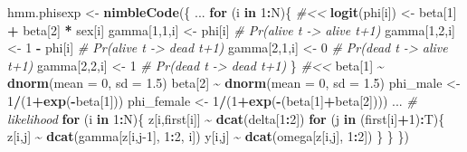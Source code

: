 \documentclass[
  12pt,
]{krantz}
\newenvironment{Shaded}{\begin{snugshade}}{\end{snugshade}}
\newcommand{\AttributeTok}[1]{\textcolor[rgb]{0.13,0.29,0.53}{#1}}
\newcommand{\CommentTok}[1]{\textcolor[rgb]{0.56,0.35,0.01}{\textit{#1}}}
\newcommand{\ControlFlowTok}[1]{\textcolor[rgb]{0.13,0.29,0.53}{\textbf{#1}}}
\newcommand{\DecValTok}[1]{\textcolor[rgb]{0.00,0.00,0.81}{#1}}
\newcommand{\FloatTok}[1]{\textcolor[rgb]{0.00,0.00,0.81}{#1}}
\newcommand{\FunctionTok}[1]{\textcolor[rgb]{0.13,0.29,0.53}{\textbf{#1}}}
\newcommand{\NormalTok}[1]{#1}
\newcommand{\OtherTok}[1]{\textcolor[rgb]{0.56,0.35,0.01}{#1}}
\newcommand{\SpecialCharTok}[1]{\textcolor[rgb]{0.81,0.36,0.00}{\textbf{#1}}}
\begin{document}
\begin{Shaded}
\begin{Highlighting}[]
\NormalTok{hmm.phisexp }\OtherTok{\textless{}{-}} \FunctionTok{nimbleCode}\NormalTok{(\{}
\NormalTok{...}
  \ControlFlowTok{for}\NormalTok{ (i }\ControlFlowTok{in} \DecValTok{1}\SpecialCharTok{:}\NormalTok{N)\{ }\CommentTok{\#\textless{}\textless{}}
    \FunctionTok{logit}\NormalTok{(phi[i]) }\OtherTok{\textless{}{-}}\NormalTok{ beta[}\DecValTok{1}\NormalTok{] }\SpecialCharTok{+}\NormalTok{ beta[}\DecValTok{2}\NormalTok{] }\SpecialCharTok{*}\NormalTok{ sex[i]}
\NormalTok{    gamma[}\DecValTok{1}\NormalTok{,}\DecValTok{1}\NormalTok{,i] }\OtherTok{\textless{}{-}}\NormalTok{ phi[i]      }\CommentTok{\# Pr(alive t {-}\textgreater{} alive t+1)}
\NormalTok{    gamma[}\DecValTok{1}\NormalTok{,}\DecValTok{2}\NormalTok{,i] }\OtherTok{\textless{}{-}} \DecValTok{1} \SpecialCharTok{{-}}\NormalTok{ phi[i]  }\CommentTok{\# Pr(alive t {-}\textgreater{} dead t+1)}
\NormalTok{    gamma[}\DecValTok{2}\NormalTok{,}\DecValTok{1}\NormalTok{,i] }\OtherTok{\textless{}{-}} \DecValTok{0}        \CommentTok{\# Pr(dead t {-}\textgreater{} alive t+1)}
\NormalTok{    gamma[}\DecValTok{2}\NormalTok{,}\DecValTok{2}\NormalTok{,i] }\OtherTok{\textless{}{-}} \DecValTok{1}        \CommentTok{\# Pr(dead t {-}\textgreater{} dead t+1)}
\NormalTok{  \} }\CommentTok{\#\textless{}\textless{}}
\NormalTok{  beta[}\DecValTok{1}\NormalTok{] }\SpecialCharTok{\textasciitilde{}} \FunctionTok{dnorm}\NormalTok{(}\AttributeTok{mean =} \DecValTok{0}\NormalTok{, }\AttributeTok{sd =} \FloatTok{1.5}\NormalTok{)}
\NormalTok{  beta[}\DecValTok{2}\NormalTok{] }\SpecialCharTok{\textasciitilde{}} \FunctionTok{dnorm}\NormalTok{(}\AttributeTok{mean =} \DecValTok{0}\NormalTok{, }\AttributeTok{sd =} \FloatTok{1.5}\NormalTok{)}
\NormalTok{  phi\_male }\OtherTok{\textless{}{-}} \DecValTok{1}\SpecialCharTok{/}\NormalTok{(}\DecValTok{1}\SpecialCharTok{+}\FunctionTok{exp}\NormalTok{(}\SpecialCharTok{{-}}\NormalTok{beta[}\DecValTok{1}\NormalTok{]))}
\NormalTok{  phi\_female }\OtherTok{\textless{}{-}} \DecValTok{1}\SpecialCharTok{/}\NormalTok{(}\DecValTok{1}\SpecialCharTok{+}\FunctionTok{exp}\NormalTok{(}\SpecialCharTok{{-}}\NormalTok{(beta[}\DecValTok{1}\NormalTok{]}\SpecialCharTok{+}\NormalTok{beta[}\DecValTok{2}\NormalTok{])))}
\NormalTok{...}
  \CommentTok{\# likelihood}
  \ControlFlowTok{for}\NormalTok{ (i }\ControlFlowTok{in} \DecValTok{1}\SpecialCharTok{:}\NormalTok{N)\{}
\NormalTok{    z[i,first[i]] }\SpecialCharTok{\textasciitilde{}} \FunctionTok{dcat}\NormalTok{(delta[}\DecValTok{1}\SpecialCharTok{:}\DecValTok{2}\NormalTok{])}
    \ControlFlowTok{for}\NormalTok{ (j }\ControlFlowTok{in}\NormalTok{ (first[i]}\SpecialCharTok{+}\DecValTok{1}\NormalTok{)}\SpecialCharTok{:}\NormalTok{T)\{}
\NormalTok{      z[i,j] }\SpecialCharTok{\textasciitilde{}} \FunctionTok{dcat}\NormalTok{(gamma[z[i,j}\DecValTok{{-}1}\NormalTok{], }\DecValTok{1}\SpecialCharTok{:}\DecValTok{2}\NormalTok{, i])}
\NormalTok{      y[i,j] }\SpecialCharTok{\textasciitilde{}} \FunctionTok{dcat}\NormalTok{(omega[z[i,j], }\DecValTok{1}\SpecialCharTok{:}\DecValTok{2}\NormalTok{])}
\NormalTok{    \}}
\NormalTok{  \}}
\NormalTok{\})}
\end{Highlighting}
\end{Shaded}
\end{document}

